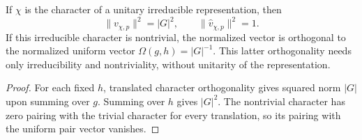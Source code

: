 \begin{lemma}
    \label{thm:peps_regular_charge_pair_normalization}
    \leanok
    If $\chi$ is the character of a unitary irreducible representation, then
    \[
        \|v_{\chi,p}\|^2=|G|^2,
        \qquad \|\widehat v_{\chi,p}\|^2=1.
    \]
    If this irreducible character is nontrivial, the normalized vector is
    orthogonal to the normalized uniform vector
    $\Omega(g,h)=|G|^{-1}$. This latter orthogonality needs only
    irreducibility and nontriviality, without unitarity of the representation.
\end{lemma}
\begin{proof}\leanok
    For each fixed $h$, translated character orthogonality gives squared
    norm $|G|$ upon summing over $g$. Summing over $h$ gives $|G|^2$.
    The nontrivial character has zero pairing with the trivial character
    for every translation, so its pairing with the uniform pair vector vanishes.
\end{proof}
